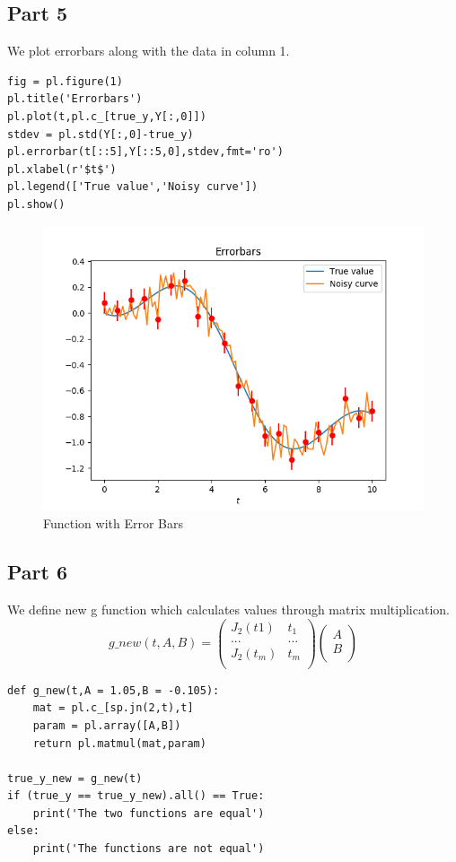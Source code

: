 \documentclass[11pt, a4paper]{article}
\begin{document}
\subsection{Part 5}
We plot errorbars along with the data in column 1.
\begin{verbatim}
fig = pl.figure(1)
pl.title('Errorbars')
pl.plot(t,pl.c_[true_y,Y[:,0]])
stdev = pl.std(Y[:,0]-true_y)
pl.errorbar(t[::5],Y[::5,0],stdev,fmt='ro')
pl.xlabel(r'$t$')
pl.legend(['True value','Noisy curve'])
pl.show()
\end{verbatim}

\begin{figure}[!htb]
   	\centering
   	\includegraphics[scale=0.5]{errorbar.png}
   	\caption{Function with Error Bars}
   	\label{fig:errorbars}
\end{figure}

\subsection{Part 6}
We define new g function which calculates values through matrix multiplication.
\begin{equation}\label{eq:1}
g\_new(t,A,B) = 
\begin{pmatrix}
J_2(t1)  & t_1 \\
... & ... \\
J_2(t_m) & t_m \\
\end{pmatrix}
\begin{pmatrix}
A \\ B\\
\end{pmatrix}
\end{equation}
\begin{verbatim}
def g_new(t,A = 1.05,B = -0.105):
	mat = pl.c_[sp.jn(2,t),t]
	param = pl.array([A,B])
	return pl.matmul(mat,param)

true_y_new = g_new(t)
if (true_y == true_y_new).all() == True:
	print('The two functions are equal')
else:
	print('The functions are not equal')
\end{verbatim}
\end{document}

